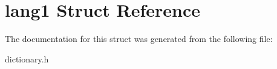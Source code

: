 \hypertarget{structlang1}{
\section{lang1 Struct Reference}
\label{structlang1}
}


The documentation for this struct was generated from the following file:\begin{DoxyCompactItemize}
\item 
dictionary.h\end{DoxyCompactItemize}
